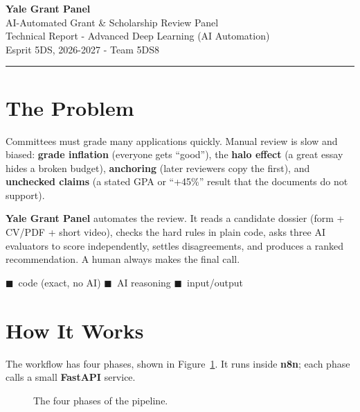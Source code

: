 \documentclass[11pt,a4paper]{article}
\begin{document}
\begin{center}
{\LARGE\bfseries\color{brand} Yale Grant Panel}\\[2pt]
{\large AI-Automated Grant \& Scholarship Review Panel}\\[5pt]
{\normalsize Technical Report - Advanced Deep Learning (AI Automation)}\\[2pt]
{\small Esprit 5DS, 2026-2027 - Team 5DS8}
\end{center}
\vspace{-6pt}
\noindent\rule{\textwidth}{0.6pt}

\section{The Problem}
Committees must grade many applications quickly. Manual review is slow and biased:
\textbf{grade inflation} (everyone gets ``good''), the \textbf{halo effect} (a great essay hides a broken budget), \textbf{anchoring} (later reviewers copy the first), and \textbf{unchecked claims} (a stated GPA or ``+45\%'' result that the documents do not support).

\textbf{Yale Grant Panel} automates the review. It reads a candidate dossier (form + CV/PDF + short video), checks the hard rules in plain code, asks three AI evaluators to score independently, settles disagreements, and produces a ranked recommendation. A human always makes the final call.

\begin{center}
\footnotesize\textcolor{blue!55!black}{$\blacksquare$}~code (exact, no AI) \quad
\textcolor{orange!70!black}{$\blacksquare$}~AI reasoning \quad
\textcolor{gray!60!black}{$\blacksquare$}~input/output
\end{center}

\section{How It Works}
The workflow has four phases, shown in Figure~\ref{fig:phases}. It runs inside \textbf{n8n}; each phase calls a small \textbf{FastAPI} service.

\begin{figure}[h]
\centering
{}
\caption{The four phases of the pipeline.}
\label{fig:phases}
\end{figure}
\end{document}
